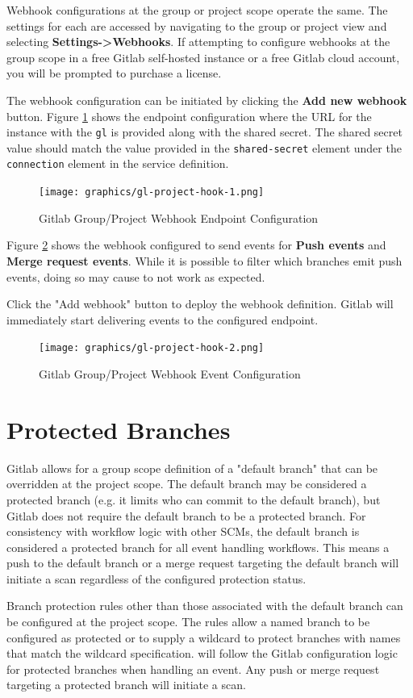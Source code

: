 Webhook configurations at the group or project scope operate the same.  The settings for each
are accessed by navigating to the group or project view and selecting \textbf{Settings->Webhooks}.
If attempting to configure webhooks at the group scope in a free Gitlab self-hosted instance or
a free Gitlab cloud account, you will be prompted to purchase a license.

The webhook configuration can be initiated by clicking the \textbf{Add new webhook} button. Figure \ref{fig:gl-project-1}
shows the endpoint configuration where the URL for the \cxoneflow instance with the \texttt{gl} is provided
along with the shared secret.  The shared secret value should match the value provided in the
\texttt{shared-secret} element under the \texttt{connection} element in the service definition.

\begin{figure}[ht]
  \centering
  \texttt{[image: graphics/gl-project-hook-1.png]}
  \caption{Gitlab Group/Project Webhook Endpoint Configuration}
  \label{fig:gl-project-1}
\end{figure}

Figure \ref{fig:gl-project-2} shows the webhook configured to send events for 
\textbf{Push events} and \textbf{Merge request events}.  While it is possible to filter
which branches emit push events, doing so may cause \cxoneflow to not work as expected.

Click the "Add webhook" button to deploy the webhook definition.  Gitlab will immediately start delivering
events to the configured \cxoneflow endpoint.


\begin{figure}[ht]
  \centering
  \texttt{[image: graphics/gl-project-hook-2.png]}
  \caption{Gitlab Group/Project Webhook Event Configuration}
  \label{fig:gl-project-2}
\end{figure}



\section{Protected Branches}

Gitlab allows for a group scope definition of a "default branch" that can be overridden at the
project scope.  The default branch may be considered a protected branch (e.g. it limits who can
commit to the default branch), but Gitlab does not require the default branch to be a protected
branch.  For consistency with \cxoneflow workflow logic with other SCMs, the default branch is
considered a protected branch for all event handling workflows.  This means a push to the 
default branch or a merge request targeting the default branch will initiate a scan regardless
of the configured protection status.

Branch protection rules other than those associated with the default branch can be configured at
the project scope.  The rules allow a named branch to be configured as protected or to supply
a wildcard to protect branches with names that match the wildcard specification.  \cxoneflow will
follow the Gitlab configuration logic for protected branches when handling an event.  Any push
or merge request targeting a protected branch will initiate a scan.
